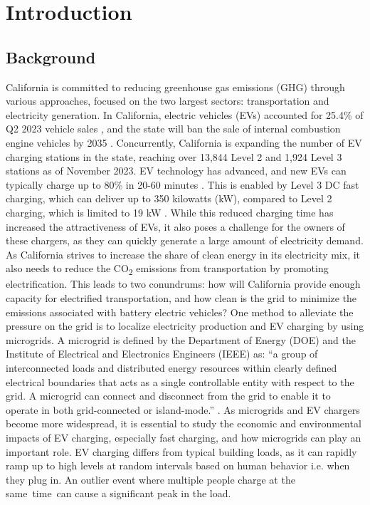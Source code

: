 \documentclass[conference]{IEEEtran}
\begin{document}
\section{Introduction}
    \subsection{Background}
		California is committed to reducing greenhouse gas emissions (GHG) through various approaches, focused on the two largest sectors: transportation and electricity generation.  In California, electric vehicles (EVs) accounted for 25.4\% of Q2 2023 vehicle sales \cite{ev_sale_percentage}, and the state will ban the sale of internal combustion engine vehicles by 2035 \cite{ice_ban}. Concurrently, California is expanding the number of EV charging stations in the state, reaching over 13,844 Level 2 and 1,924 Level 3 stations \cite{ev_stations_CA} as of November 2023. EV technology has advanced, and new EVs can typically charge up to 80\% in 20-60 minutes \cite{ev_stats}. This is enabled by Level 3 DC fast charging, which can deliver up to 350 kilowatts (kW), compared to Level 2 charging, which is limited to 19 kW \cite{ev_stats}. While this reduced charging time has increased the attractiveness of EVs, it also poses a challenge for the owners of these chargers, as they can quickly generate a large amount of electricity demand. As California strives to increase the share of clean energy in its electricity mix, it also needs to reduce the CO\textsubscript{2} emissions from transportation by promoting electrification. This leads to two conundrums: how will California provide enough capacity for electrified transportation, and how clean is the grid to minimize the emissions associated with battery electric vehicles? One method to alleviate the pressure on the grid is to localize electricity production and EV charging by using microgrids. A microgrid is defined by the Department of Energy (DOE) and the Institute of Electrical and Electronics Engineers (IEEE) as: “a group of interconnected loads and distributed energy resources within clearly defined electrical boundaries that acts as a single controllable entity with respect to the grid. A microgrid can connect and disconnect from the grid to enable it to operate in both grid-connected or island-mode.” \cite{microgrid_def} \cite{microgrid_def_ieee}. As microgrids and EV chargers become more widespread, it is essential to study the economic and environmental impacts of EV charging, especially fast charging, and how microgrids can play an important role. EV charging differs from typical building loads, as it can rapidly ramp up to high levels at random intervals based on human behavior i.e. when they plug in. An outlier event where multiple people charge at the same time can cause a significant peak in the load. 
		
\end{document}
